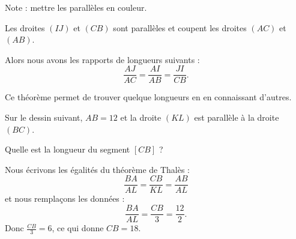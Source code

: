 



\vspace{1cm}

Note : mettre les parallèles en couleur.

\begin{theorem}
    Les droites \( (IJ)\) et \( (CB)\) sont parallèles et coupent les droites \( (AC)\) et \( (AB)\).

\begin{center}
   
\end{center}

Alors nous avons les rapports de longueurs suivants :
\begin{equation}
    \frac{ AJ }{ AC }=\frac{ AI }{ AB }=\frac{ JI }{ CB }.
\end{equation}

\end{theorem}

Ce théorème permet de trouver quelque longueurs en en connaissant d'autres.

\begin{example}
    
    Sur le dessin suivant, \( AB=12\) et la droite \( (KL)\) est parallèle à la droite \( (BC)\).
\begin{center}
   
\end{center}
Quelle est la longueur du segment \( [CB]\) ?

Nous écrivons les égalités du théorème de Thalès :
\begin{equation}
    \frac{ BA }{ AL }=\frac{ CB }{ KL }=\frac{ AB }{ AL }
\end{equation}
et nous remplaçons les données :
\begin{equation}
    \frac{ BA }{ AL }=\frac{ CB }{ 3 }=\frac{ 12 }{ 2 }.
\end{equation}
Donc \( \frac{ CB }{ 3 }=6\), ce qui donne \( CB=18\).

\end{example}




